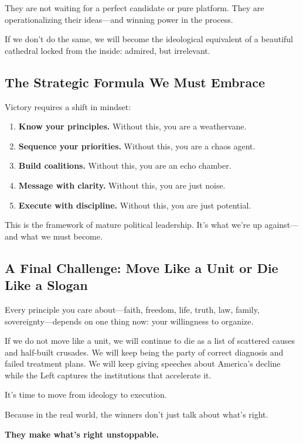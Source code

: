 They are not waiting for a perfect candidate or pure platform. They are operationalizing their ideas—and winning power in the process.

If we don’t do the same, we will become the ideological equivalent of a beautiful cathedral locked from the inside: admired, but irrelevant.

\subsection*{The Strategic Formula We Must Embrace}

Victory requires a shift in mindset:

\begin{enumerate}
    \item \textbf{Know your principles.} Without this, you are a weathervane.
    \item \textbf{Sequence your priorities.} Without this, you are a chaos agent.
    \item \textbf{Build coalitions.} Without this, you are an echo chamber.
    \item \textbf{Message with clarity.} Without this, you are just noise.
    \item \textbf{Execute with discipline.} Without this, you are just potential.
\end{enumerate}

This is the framework of mature political leadership. It’s what we’re up against—and what we must become.

\subsection*{A Final Challenge: Move Like a Unit or Die Like a Slogan}

Every principle you care about—faith, freedom, life, truth, law, family, sovereignty—depends on one thing now: your willingness to organize.

If we do not move like a unit, we will continue to die as a list of scattered causes and half-built crusades. We will keep being the party of correct diagnosis and failed treatment plans. We will keep giving speeches about America’s decline while the Left captures the institutions that accelerate it.

It’s time to move from ideology to execution.

Because in the real world, the winners don’t just talk about what’s right.

\textbf{They make what’s right unstoppable.}
